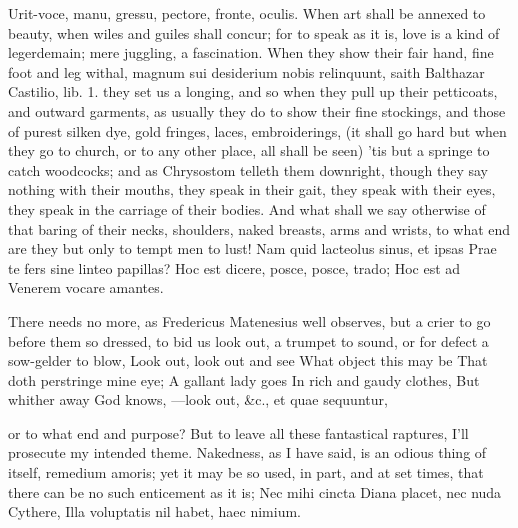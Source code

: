 {Urit-voce, manu, gressu, pectore, fronte, oculis. When art shall
be annexed to beauty, when wiles and guiles shall concur; for to speak
as it is, love is a kind of legerdemain; mere juggling, a fascination.
When they show their fair hand, fine foot and leg withal, magnum sui
desiderium nobis relinquunt, saith Balthazar Castilio, lib. 1.
they set us a longing, and so when they pull up their petticoats, and
outward garments, as usually they do to show their fine stockings, and
those of purest silken dye, gold fringes, laces, embroiderings, (it
shall go hard but when they go to church, or to any other place, all
shall be seen) 'tis but a springe to catch woodcocks; and as
Chrysostom telleth them downright, though they say nothing with
their mouths, they speak in their gait, they speak with their eyes,
they speak in the carriage of their bodies. And what shall we say
otherwise of that baring of their necks, shoulders, naked breasts, arms
and wrists, to what end are they but only to tempt men to lust!
Nam quid lacteolus sinus, et ipsas
Prae te fers sine linteo papillas?
Hoc est dicere, posce, posce, trado;
Hoc est ad Venerem vocare amantes.

There needs no more, as Fredericus Matenesius well observes, but
a crier to go before them so dressed, to bid us look out, a trumpet to
sound, or for defect a sow-gelder to blow,
Look out, look out and see
What object this may be
That doth perstringe mine eye;
A gallant lady goes
In rich and gaudy clothes,
But whither away God knows,
---look out, \&c., et quae sequuntur,

or to what end and purpose? But to leave all these fantastical
raptures, I'll prosecute my intended theme. Nakedness, as I have said,
is an odious thing of itself, remedium amoris; yet it may be so used,
in part, and at set times, that there can be no such enticement as it
is;
Nec mihi cincta Diana placet, nec nuda Cythere,
Illa voluptatis nil habet, haec nimium.

}
